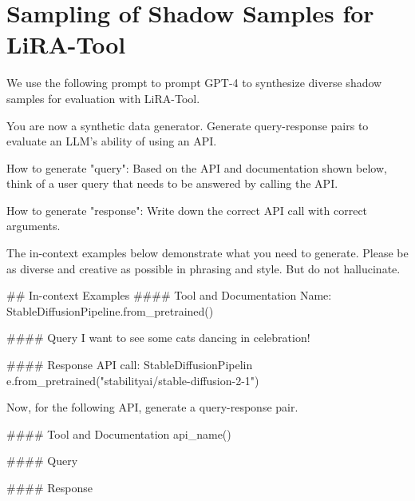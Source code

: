 \section{Sampling of Shadow Samples for LiRA-Tool}\label{sec:prompt_shadow_sample}

We use the following prompt to prompt GPT-4 to synthesize diverse shadow samples for evaluation with LiRA-Tool.

\begin{bluebox}
You are now a synthetic data generator. Generate query-response pairs to evaluate an LLM's ability of using an API. 

How to generate "query": Based on the API and documentation shown below, think of a user query that needs to be answered by calling the API. 

How to generate "response": Write down the correct API call with correct arguments. 

The in-context examples below demonstrate what you need to generate. Please be as diverse and creative as possible in phrasing and style. But do not hallucinate.

\#\# In-context Examples 
\#\#\#\# Tool and Documentation 
Name: StableDiffusionPipeline.from\_pretrained() 

\#\#\#\# Query
I want to see some cats dancing in celebration!

\#\#\#\# Response
API call: StableDiffusionPipelin e.from\_pretrained("stabilityai/stable-diffusion-2-1")


Now, for the following API, generate a query-response pair.

\#\#\#\# Tool and Documentation
api\_name()

\#\#\#\# Query

\#\#\#\# Response 
\end{bluebox}